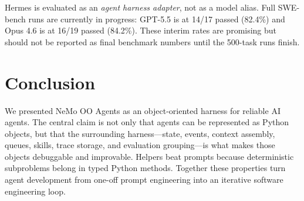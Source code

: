 \documentclass[11pt, logo, onecolumn, copyright, colorlinks=true, allcolors=blue]{nvidiatechreport}
\begin{document}
Hermes is evaluated as an \emph{agent harness adapter}, not as a model alias.
Full SWE-bench runs are currently in progress: GPT-5.5 is at 14/17 passed
(82.4\%) and Opus 4.6 is at 16/19 passed (84.2\%). These interim rates
are promising but should not be reported as final benchmark numbers until the
500-task runs finish.


\section*{Conclusion}
\label{sec:conclusion}

We presented NeMo OO Agents as an object-oriented harness for reliable AI
agents. The central claim is not only that agents can be represented as Python
objects, but that the surrounding harness---state, events, context assembly,
queues, skills, trace storage, and evaluation grouping---is what makes those
objects debuggable and improvable. Helpers beat prompts because deterministic
subproblems belong in typed Python methods. Together these
properties turn agent development from one-off prompt engineering into an
iterative software engineering loop.



\end{document}
